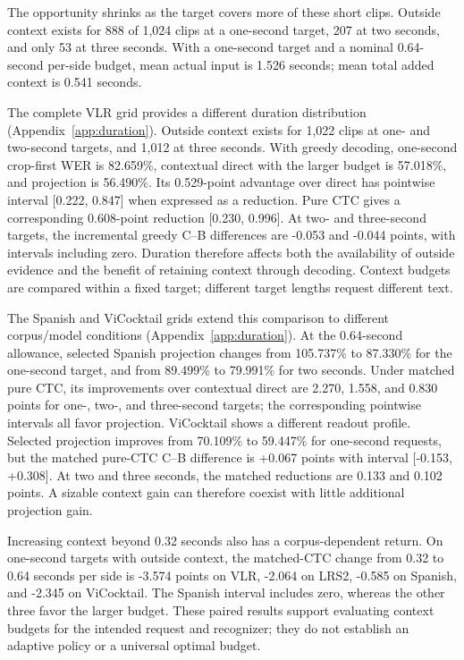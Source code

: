 The opportunity shrinks as the target covers more of these short clips.
Outside context exists for 888 of 1,024 clips at a one-second target,
207 at two seconds, and only 53 at three seconds. With a one-second target
and a nominal 0.64-second per-side budget, mean actual input is 1.526 seconds;
mean total added context is 0.541 seconds.

The complete VLR grid provides a different duration distribution
(Appendix~\ref{app:duration}). Outside context exists for 1,022 clips at
one- and two-second targets, and 1,012 at three seconds. With greedy decoding,
one-second crop-first WER is 82.659\%, contextual direct with the larger
budget is 57.018\%, and projection is 56.490\%. Its 0.529-point advantage
over direct has pointwise interval [0.222, 0.847] when expressed as a reduction.
Pure CTC gives a corresponding 0.608-point reduction [0.230, 0.996].
At two- and three-second targets, the incremental greedy C--B differences
are -0.053 and -0.044 points, with intervals including zero. Duration therefore
affects both the availability of outside evidence and the benefit of retaining
context through decoding. Context budgets are compared within a fixed target;
different target lengths request different text.

The Spanish and ViCocktail grids extend this comparison to different
corpus/model conditions (Appendix~\ref{app:duration}). At the 0.64-second
allowance, selected Spanish projection changes from 105.737\% to 87.330\%
for the one-second target, and from 89.499\% to 79.991\% for two seconds.
Under matched pure CTC, its improvements over contextual direct are
2.270, 1.558, and 0.830 points for one-, two-, and three-second targets;
the corresponding pointwise intervals all favor projection.
ViCocktail shows a different readout profile. Selected projection improves
from 70.109\% to 59.447\% for one-second requests, but the matched pure-CTC
C--B difference is +0.067 points with interval [-0.153, +0.308]. At two and
three seconds, the matched reductions are 0.133 and 0.102 points. A sizable
context gain can therefore coexist with little additional projection gain.

Increasing context beyond 0.32 seconds also has a corpus-dependent return.
On one-second targets with outside context, the matched-CTC change from
0.32 to 0.64 seconds per side is -3.574 points on VLR, -2.064 on LRS2,
-0.585 on Spanish, and -2.345 on ViCocktail. The Spanish interval includes
zero, whereas the other three favor the larger budget. These paired results
support evaluating context budgets for the intended request and recognizer;
they do not establish an adaptive policy or a universal optimal budget.


